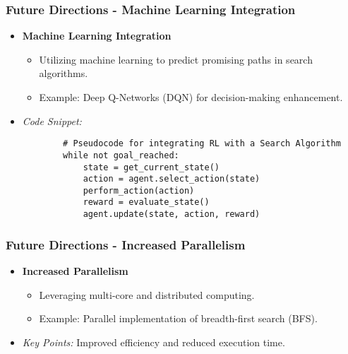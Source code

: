 \documentclass[aspectratio=169]{beamer}
\begin{document}
\begin{frame}[fragile]
    \frametitle{Future Directions - Machine Learning Integration}
    \begin{itemize}
        \item \textbf{Machine Learning Integration}
            \begin{itemize}
                \item Utilizing machine learning to predict promising paths in search algorithms.
                \item Example: Deep Q-Networks (DQN) for decision-making enhancement.
            \end{itemize}
        \item \textit{Code Snippet:}
        \begin{lstlisting}
        # Pseudocode for integrating RL with a Search Algorithm
        while not goal_reached:
            state = get_current_state()
            action = agent.select_action(state)
            perform_action(action)
            reward = evaluate_state()
            agent.update(state, action, reward)
        \end{lstlisting}
    \end{itemize}
\end{frame}

\begin{frame}[fragile]
    \frametitle{Future Directions - Increased Parallelism}
    \begin{itemize}
        \item \textbf{Increased Parallelism}
            \begin{itemize}
                \item Leveraging multi-core and distributed computing.
                \item Example: Parallel implementation of breadth-first search (BFS).
            \end{itemize}
        \item \textit{Key Points:} Improved efficiency and reduced execution time.
    \end{itemize}
\end{frame}
\end{document}
